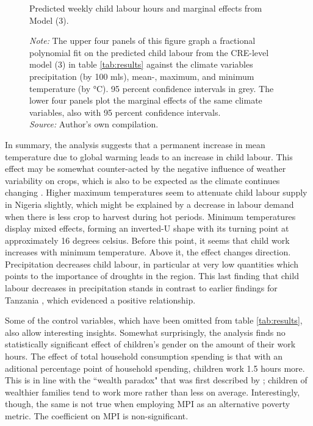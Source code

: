 \documentclass[a4paper,12pt]{article}
\theoremstyle{plain}
\theoremstyle{definition}
\theoremstyle{definition}
\theoremstyle{definition}
\theoremstyle{definition}
\begin{document}
\begin{figure}[H]
    \caption{Predicted weekly child labour hours and marginal effects from Model (3).}
    \caption*{\footnotesize{\textit{Note:} The upper four panels of this figure graph a fractional polynomial fit on the predicted child labour from the CRE-level model (3) in table \ref{tab:results} against the climate variables precipitation (by 100 mls), mean-, maximum, and minimum temperature (by °C). 95 percent confidence intervals in grey. The lower four panels plot the marginal effects of the same climate variables, also with 95 percent confidence intervals. \\ \textit{Source:} Author's own compilation.}}
    \label{fig:effects}
\end{figure}

In summary, the analysis suggests that a permanent increase in mean temperature due to global warming leads to an increase in child labour. This effect may be somewhat counter-acted by the negative influence of weather variability on crops, which is also to be expected as the climate continues changing \citep{Pachauri2014}. Higher maximum temperatures seem to attenuate child labour supply in Nigeria slightly, which might be explained by a decrease in labour demand when there is less crop to harvest during hot periods. Minimum temperatures display mixed effects, forming an inverted-U shape with its turning point at approximately 16 degrees celsius. Before this point, it seems that child work increases with minimum temperature. Above it, the effect changes direction. Precipitation decreases child labour, in particular at very low quantities which points to the importance of droughts in the region. This last finding that child labour decreases in precipitation stands in contrast to earlier findings for Tanzania \citep{Dumas2020}, which evidenced a positive relationship.

Some of the control variables, which have been omitted from table \ref{tab:results}, also allow interesting insights. Somewhat surprisingly, the analysis finds no statistically significant effect of children's gender on the amount of their work hours. The effect of total household consumption spending is that with an aditional percentage point of household spending, children work 1.5 hours more. This is in line with the ``wealth paradox" that was first described by \citet{Bhalotra2003}; children of wealthier families tend to work more rather than less on average. Interestingly, though, the same is not true when employing MPI as an alternative poverty metric. The coefficient on MPI is non-significant.
\end{document}
